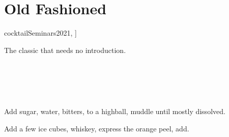 \section[Old Fashioned]{Old Fashioned~}

\begin{recipestats}[
        servings=1,
        preptime=5 \minute,
        original=\citefield{cocktailSeminars2021}{title}~\cite[p.~1.2]{cocktailSeminars2021},
    ]
\end{recipestats}

\begin{recipeabstract}
    The classic that needs no introduction.
\end{recipeabstract}

\begin{ingredientcolumns}[1]
    \begin{ingredientblock}
        \\
        \\
    \end{ingredientblock}
    \begin{ingredientblock}
        \\
    \end{ingredientblock}
\end{ingredientcolumns}

\begin{preparation}
\item Add sugar, water, bitters, to a highball, muddle until mostly dissolved.
\item Add a few ice cubes, whiskey, express the orange peel, add.
\end{preparation}

\recipeend%
